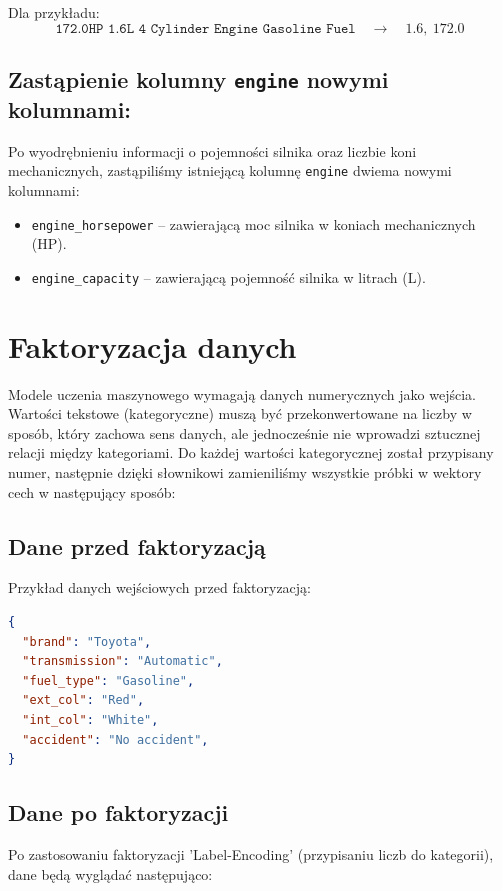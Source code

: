 \documentclass[12pt, a4paper]{report}
\begin{document}
Dla przykładu:
\[
\texttt{172.0HP 1.6L 4 Cylinder Engine Gasoline Fuel} \quad \rightarrow \quad 1.6, \ 172.0
\]

\subsection*{Zastąpienie kolumny \texttt{engine} nowymi kolumnami:}
Po wyodrębnieniu informacji o pojemności silnika oraz liczbie koni mechanicznych, zastąpiliśmy istniejącą kolumnę \texttt{engine} dwiema nowymi kolumnami:
\begin{itemize}
    \item \texttt{engine\_horsepower} – zawierającą moc silnika w koniach mechanicznych (HP).
    \item \texttt{engine\_capacity} – zawierającą pojemność silnika w litrach (L).
\end{itemize}

\section{Faktoryzacja danych}
    Modele uczenia maszynowego wymagają danych numerycznych jako wejścia. Wartości tekstowe (kategoryczne) muszą być przekonwertowane na liczby w sposób, który zachowa sens danych, ale jednocześnie nie wprowadzi sztucznej relacji między kategoriami. Do każdej wartości kategorycznej został przypisany numer, następnie dzięki słownikowi zamieniliśmy wszystkie próbki w wektory cech w następujący sposób:

\subsection*{Dane przed faktoryzacją}
Przykład danych wejściowych przed faktoryzacją:

\begin{lstlisting}[language=json, frame=single, basicstyle=\ttfamily\small, backgroundcolor=\color{lightgray}, stepnumber=1, numbersep=5pt]
{
  "brand": "Toyota",
  "transmission": "Automatic",
  "fuel_type": "Gasoline",
  "ext_col": "Red",
  "int_col": "White",
  "accident": "No accident",
}
\end{lstlisting}

\subsection*{Dane po faktoryzacji}
Po zastosowaniu faktoryzacji 'Label-Encoding' (przypisaniu liczb do kategorii), dane będą wyglądać następująco:
\end{document}
